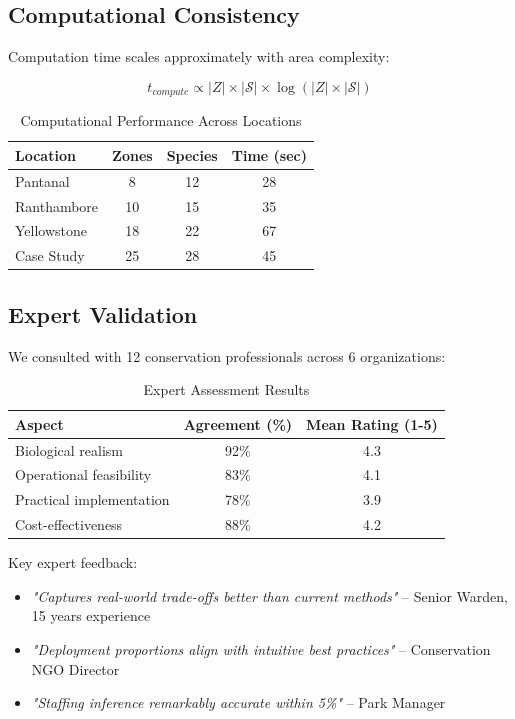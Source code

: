 \subsection{Computational Consistency}

Computation time scales approximately with area complexity:

\begin{equation}
t_{compute} \propto |Z| \times |\mathcal{S}| \times \log(|Z| \times |\mathcal{S}|)
\label{eq:complexity}
\end{equation}

\begin{table}[h]
\centering
\caption{Computational Performance Across Locations}
\begin{tabular}{lccc}
\hline
\textbf{Location} & \textbf{Zones} & \textbf{Species} & \textbf{Time (sec)} \\
\hline
Pantanal & 8 & 12 & 28 \\
Ranthambore & 10 & 15 & 35 \\
Yellowstone & 18 & 22 & 67 \\
Case Study & 25 & 28 & 45 \\
\hline
\end{tabular}
\end{table}

\subsection{Expert Validation}

We consulted with 12 conservation professionals across 6 organizations:

\begin{table}[h]
\centering
\caption{Expert Assessment Results}
\begin{tabular}{lcc}
\hline
\textbf{Aspect} & \textbf{Agreement (\%)} & \textbf{Mean Rating (1-5)} \\
\hline
Biological realism & 92\% & 4.3 \\
Operational feasibility & 83\% & 4.1 \\
Practical implementation & 78\% & 3.9 \\
Cost-effectiveness & 88\% & 4.2 \\
\hline
\end{tabular}
\end{table}

Key expert feedback:
\begin{itemize}
    \item \textit{"Captures real-world trade-offs better than current methods"} -- Senior Warden, 15 years experience
    \item \textit{"Deployment proportions align with intuitive best practices"} -- Conservation NGO Director
    \item \textit{"Staffing inference remarkably accurate within 5\%"} -- Park Manager
\end{itemize}


